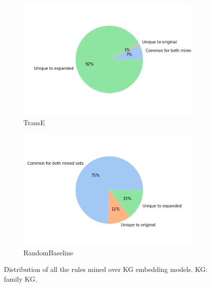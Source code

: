 \begin{figure}[htbp]
\begin{subfigure}[b]{0.49\textwidth}
            \centering 
            \includegraphics[width=\textwidth]{figures/results/pie_charts-model/transE_family.png}
            \caption[]%
            {{\small TransE}}    
            \label{fig:trasE_pie_family}
        \end{subfigure}
        \hfill
        \begin{subfigure}[b]{0.49\textwidth}   
            \centering 
            \includegraphics[width=\textwidth]{figures/results/pie_charts-model/randomBaseline_family.png}
            \caption[]%
            {{\small RandomBaseline}}    
            \label{fig:randomBaseline_pie_family}
        \end{subfigure}
        \caption[ The average and standard deviation of critical parameters ]
        {\small Distribution of all the rules mined over KG embedding models. KG: family KG.} 
        \label{fig:model_pies_family}
    \end{figure}
    
